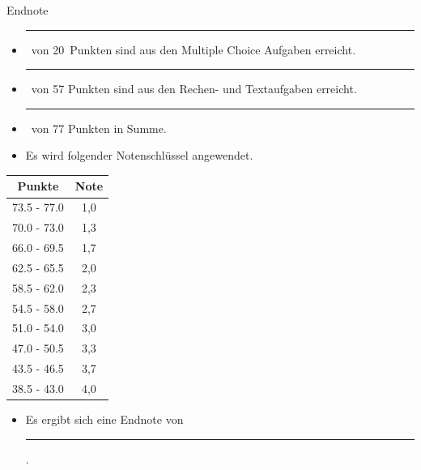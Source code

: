 \documentclass[a4paper, 9pt]{scrartcl}\usepackage[]{graphicx}\usepackage[]{xcolor}
\begin{document}
\begin{graybox}{Endnote}
  \vspace{1Ex}
  \begin{itemize}
  \item[] \rule[0ex]{3em}{.4pt}\, von 20\, Punkten sind aus den Multiple
    Choice Aufgaben erreicht.
  \item[] \rule[0ex]{3em}{.4pt}\, von 57 Punkten sind aus den Rechen- und
    Textaufgaben erreicht. 
  \item[] \rule[0ex]{3em}{.4pt}\, von 77 Punkten in Summe.
  \item[] Es wird folgender Notenschlüssel angewendet.   
  \end{itemize}
  \vspace{1ex}
\begin{center}
  \begin{tabular}[c]{cc}
    \toprule
    \textbf{Punkte}	&	\textbf{Note}	\\
    \midrule
    73.5 - 77.0	&	1,0	\\
    70.0 - 73.0	&	1,3	\\
    66.0 - 69.5	&	1,7	\\
    62.5 - 65.5	&	2,0	\\
    58.5 - 62.0	&	2,3	\\
    54.5 - 58.0	&	2,7	\\
    51.0 - 54.0	&	3,0	\\
    47.0 - 50.5	&	3,3	\\
    43.5 - 46.5	&	3,7	\\
    38.5 - 43.0	&	4,0	\\
    \bottomrule
  \end{tabular}
\end{center}
  \vspace{1ex}
\begin{itemize}
\item[] Es ergibt sich eine Endnote von \rule[0ex]{4em}{.4pt}.
\end{itemize}
  \vspace{1Ex}
\end{graybox}

\newpage
\end{document}
